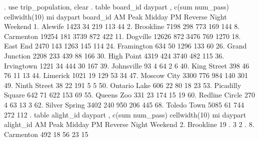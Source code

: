 . use trip_population, clear
{\smallskip}
. table board_id daypart , c(sum num_pass) cellwidth(10) mi
{\smallskip}
                     {\VBAR}                          daypart                          
            board_id {\VBAR}    AM Peak      Midday  PM Reverse       Night     Weekend
          1. Alewife {\VBAR}       1423          34         219         113          44
        2. Brookline {\VBAR}       7198         298         773         169         144
        8. Carmenton {\VBAR}      19254         181        3739         872         422
        11. Dogville {\VBAR}      12626         872        3476         769        1270
        18. East End {\VBAR}       2470         143        1263         145         114
      24. Framington {\VBAR}        634          50        1296         133          60
  26. Grand Junction {\VBAR}       2208         233         439          88         166
      30. High Point {\VBAR}       4319         424        3740         482         115
      36. Irvingtown {\VBAR}       1221          34         444          30         167
      39. Johnsville {\VBAR}         93           4          64           2           6
     40. King Street {\VBAR}        398          46          76          11          13
        44. Limerick {\VBAR}       1021          19         129          53          34
     47. Moscow City {\VBAR}       3300         776         984         140         301
    49. Ninth Street {\VBAR}         38          22         191           5           5
    50. Ontario Lake {\VBAR}        606          22          80          18          23
53. Picadilly Square {\VBAR}        642          71         622         153          69
      55. Queens Zoo {\VBAR}        331          23         174          15          19
  60. Redline Circle {\VBAR}        270           4          63          13           3
   62. Silver Spring {\VBAR}       3402         240         950         206         445
     68. Toledo Town {\VBAR}       5085          61         744         272         112
{\smallskip}
. table alight_id daypart , c(sum num_pass) cellwidth(10) mi
{\smallskip}
                     {\VBAR}                          daypart                          
           alight_id {\VBAR}    AM Peak      Midday  PM Reverse       Night     Weekend
        2. Brookline {\VBAR}         19           .           3           2           .
        8. Carmenton {\VBAR}        492          18          56          23          15
